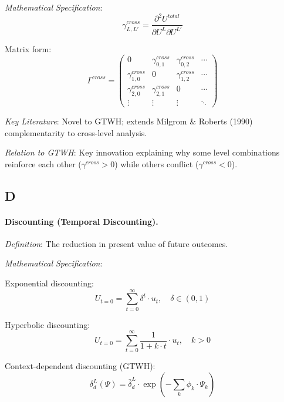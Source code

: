 \documentclass[12pt,a4paper]{article}
\begin{document}
\textit{Mathematical Specification}:
\begin{equation}
\gamma^{cross}_{L,L'} = \frac{\partial^2 U^{total}}{\partial U^L \partial U^{L'}}
\end{equation}

Matrix form:
\begin{equation}
\Gamma^{cross} = \begin{pmatrix}
0 & \gamma^{cross}_{0,1} & \gamma^{cross}_{0,2} & \cdots \\
\gamma^{cross}_{1,0} & 0 & \gamma^{cross}_{1,2} & \cdots \\
\gamma^{cross}_{2,0} & \gamma^{cross}_{2,1} & 0 & \cdots \\
\vdots & \vdots & \vdots & \ddots
\end{pmatrix}
\end{equation}

\textit{Key Literature}: Novel to GTWH; extends Milgrom \& Roberts (1990) 
complementarity to cross-level analysis.

\textit{Relation to GTWH}: Key innovation explaining why some level combinations 
reinforce each other ($\gamma^{cross} > 0$) while others conflict ($\gamma^{cross} < 0$).

\subsection*{D}

\paragraph{Discounting (Temporal Discounting).}
\textit{Definition}: The reduction in present value of future outcomes.

\textit{Mathematical Specification}:

Exponential discounting:
\begin{equation}
U_{t=0} = \sum_{t=0}^{\infty} \delta^t \cdot u_t, \quad \delta \in (0,1)
\end{equation}

Hyperbolic discounting:
\begin{equation}
U_{t=0} = \sum_{t=0}^{\infty} \frac{1}{1 + k \cdot t} \cdot u_t, \quad k > 0
\end{equation}

Context-dependent discounting (GTWH):
\begin{equation}
\delta^L_d(\Psi) = \bar{\delta}^L_d \cdot \exp\left(-\sum_k \phi_k \cdot \Psi_k\right)
\end{equation}
\end{document}
